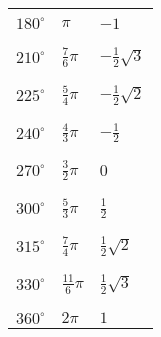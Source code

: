 \documentclass[6pt,a4paper]{scrartcl}
\begin{document}
\begin{multicols*}{3}
\begin{tabular}{lll}
\\
\hline
\\
$180^\circ$ & $\pi$             & $-1$ \\
\\
\hline
\\
$210^\circ$ & $\frac{7}{6}\pi$  & $-\frac{1}{2}\sqrt{3}$ \\
\\
\hline
\\
$225^\circ$ & $\frac{5}{4}\pi$  & $-\frac{1}{2}\sqrt{2}$ \\
\\
\hline
\\
$240^\circ$ & $\frac{4}{3}\pi$  & $-\frac{1}{2}$ \\
\\
\hline
\\
$270^\circ$ & $\frac{3}{2}\pi$  & $0$ \\
\\
\hline
\\
$300^\circ$ & $\frac{5}{3}\pi$  & $\frac{1}{2}$ \\
\\
\hline
\\
$315^\circ$ & $\frac{7}{4}\pi$  & $\frac{1}{2}\sqrt{2}$ \\
\\
\hline
\\
$330^\circ$ & $\frac{11}{6}\pi$ & $\frac{1}{2}\sqrt{3}$ \\
\\
\hline
\\
$360^\circ$ & $2\pi$            & $1$ \\
\end{tabular}


\end{multicols*}


\end{document}
